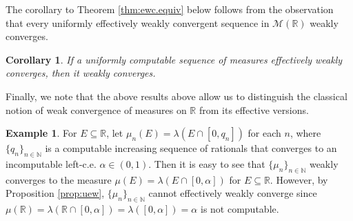 \documentclass{amsart}
\newcommand{\R}{\mathbb{R}}
\newcommand{\N}{\mathbb{N}}
\newcommand{\B}{\mathcal{B}}
\newcommand{\M}{\mathcal{M}}
\newcommand{\halts}{\hspace{-0.1cm}\downarrow}
\newcommand{\divs}{\hspace{-0.1cm}\uparrow}
\newtheorem{corollary}[theorem]{Corollary}
\theoremstyle{definition}
\newtheorem{example}[theorem]{Example}
\numberwithin{equation}{section}
\begin{document}
The corollary to Theorem \ref{thm:ewc.equiv} below follows from the observation that every uniformly effectively weakly convergent sequence in $\M(\R)$ weakly converges.

\begin{corollary}\label{cor:ewc.2.wc}
If a uniformly computable sequence of measures effectively weakly converges, then it weakly converges.
\end{corollary}

Finally, we note that the above results above allow us to distinguish the classical notion of weak convergence of measures on $\R$ from its effective versions.

\begin{example}\label{ex:not.ewc}
For $E\subseteq\R$, let $\mu_n(E)=\lambda(E\cap[0,q_n])$ for each $n$, where $\{q_n\}_{n\in\N}$ is a computable increasing sequence of rationals that converges to an incomputable left-c.e. $\alpha\in(0,1)$. Then it is easy to see that $\{\mu_n\}_{n\in\N}$ weakly converges to the measure $\mu(E)=\lambda(E\cap[0,\alpha])$ for $E\subseteq\R$. However, by Proposition \ref{prop:uew}, $\{\mu_n\}_{n\in\N}$ cannot effectively weakly converge since $\mu(\R)=\lambda(\R\cap[0,\alpha])=\lambda([0,\alpha])=\alpha$ is not computable.
\end{example}

%
%
\end{document}
